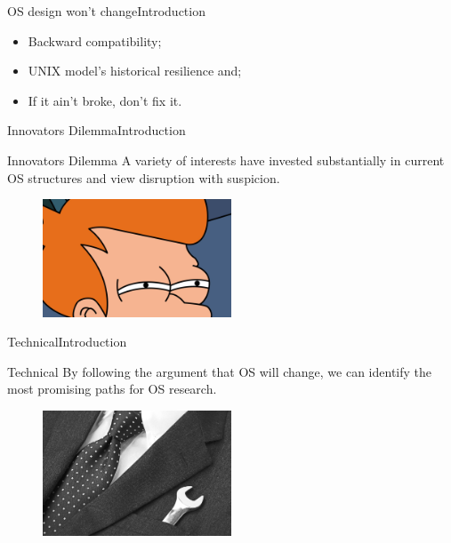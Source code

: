 \documentclass[10pt]{beamer}
\begin{document}
\begin{frame}{OS design won't change}{Introduction}
  \begin{itemize}
    \item Backward compatibility; \pause
    \item UNIX model's historical resilience and; \pause
    \item If it ain't broke, don't fix it.
  \end{itemize}
\end{frame}

\begin{frame}{Innovators Dilemma}{Introduction}

  \begin{block}{Innovators Dilemma}
  A variety of interests have invested substantially in current OS structures
  and view disruption with suspicion.
  \end{block}

  \begin{figure}[ht]
    \hspace{-120pt}
    \includegraphics[width=0.5\textwidth, keepaspectratio=true]{images/frysuspicious.jpg}
  \end{figure}

\end{frame}

\begin{frame}{Technical}{Introduction}
  \begin{block}{Technical}
  By following the argument that OS will change, we can identify the
  most promising paths for OS research.
  \end{block}

  \begin{figure}[ht]
    \hspace{100pt}
    \includegraphics[width=0.5\textwidth, keepaspectratio=true]{images/technical.jpg}
  \end{figure}

\end{frame}
\end{document}

